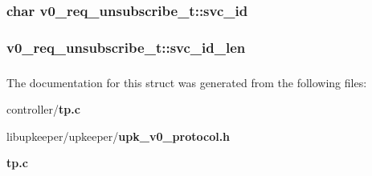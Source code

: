 \subsubsection[{svc\_\-id}]{\setlength{\rightskip}{0pt plus 5cm}char {\bf v0\_\-req\_\-unsubscribe\_\-t::svc\_\-id}}\label{structv0__req__unsubscribe__t_ad6cce414852a33659d55ab76e48da8f0}
\subsubsection[{svc\_\-id\_\-len}]{ {\bf v0\_\-req\_\-unsubscribe\_\-t::svc\_\-id\_\-len}}\label{structv0__req__unsubscribe__t_ab6cc27dd58110257f1174d9b4dfe818c}
\subsubsection[{UPK\_\-V0\_\-REQ\_\-UNSUBS\_\-T\_\-FIELDS}]{}\label{structv0__req__unsubscribe__t_a3ef7d23a7d85581c997ebf550b345572}


The documentation for this struct was generated from the following files:\begin{DoxyCompactItemize}
\item 
controller/{\bf tp.c}\item 
libupkeeper/upkeeper/{\bf upk\_\-v0\_\-protocol.h}\item 
{\bf tp.c}\end{DoxyCompactItemize}
